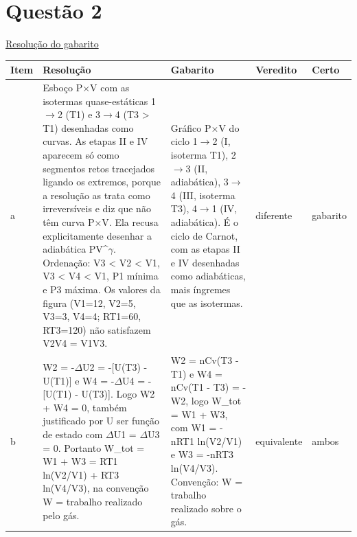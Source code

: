 \documentclass{article}%
\begin{document}
\section*{Questão 2}%
\href{https://poliedroresolve.sistemapoliedro.com.br/vestibulares/ime/2027/ime-2-fase-dia-3-28-10-2026-2-fase-dia-3/dissertativa-2-quimica-2-fase-dia-3-ime-2027}{Resolução do gabarito}\par\smallskip%
\begin{longtable}{@{}p{} p{} p{} p{} p{}@{}}\toprule Item & Resolução & Gabarito & Veredito & Certo \\ \midrule
a & Esboço P$\times$V com as isotermas quase{-}estáticas 1$\to$2 (T1) e 3$\to$4 (T3 > T1) desenhadas como curvas. As etapas II e IV aparecem só como segmentos retos tracejados ligando os extremos, porque a resolução as trata como irreversíveis e diz que não têm curva P$\times$V. Ela recusa explicitamente desenhar a adiabática PV\^{}$\gamma$. Ordenação: V3 < V2 < V1, V3 < V4 < V1, P1 mínima e P3 máxima. Os valores da figura (V1=12, V2=5, V3=3, V4=4; RT1=60, RT3=120) não satisfazem V2V4 = V1V3. & Gráfico P$\times$V do ciclo 1$\to$2 (I, isoterma T1), 2$\to$3 (II, adiabática), 3$\to$4 (III, isoterma T3), 4$\to$1 (IV, adiabática). É o ciclo de Carnot, com as etapas II e IV desenhadas como adiabáticas, mais íngremes que as isotermas. & diferente & gabarito \\
b & W2 = -$\Delta$U2 = -{[}U(T3) - U(T1){]} e W4 = -$\Delta$U4 = -{[}U(T1) - U(T3){]}. Logo W2 + W4 = 0, também justificado por U ser função de estado com $\Delta$U1 = $\Delta$U3 = 0. Portanto W\_tot = W1 + W3 = RT1 ln(V2/V1) + RT3 ln(V4/V3), na convenção W = trabalho realizado pelo gás. & W2 = nCv(T3 - T1) e W4 = nCv(T1 - T3) = -W2, logo W\_tot = W1 + W3, com W1 = -nRT1 ln(V2/V1) e W3 = -nRT3 ln(V4/V3). Convenção: W = trabalho realizado sobre o gás. & equivalente & ambos \\
\bottomrule\end{longtable}%
\end{document}
